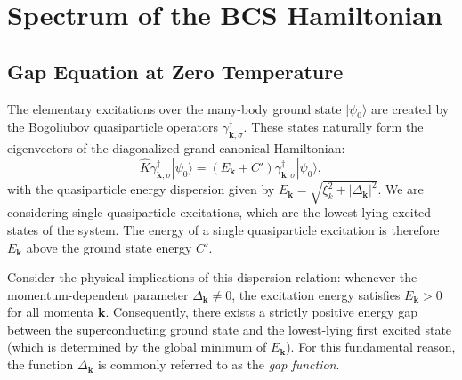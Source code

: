 \section{Spectrum of the BCS Hamiltonian}

\subsection{Gap Equation at Zero Temperature}

The elementary excitations over the many-body ground state \( |\psi_0\rangle \) are created by the Bogoliubov quasiparticle operators \( \gamma_{\mathbf{k},\sigma}^\dagger \). These states naturally form the eigenvectors of the diagonalized grand canonical Hamiltonian:
\[
    \hat{K}\gamma_{\mathbf{k},\sigma}^\dagger |\psi_0\rangle = (E_{\mathbf{k}} + C')\gamma_{\mathbf{k},\sigma}^\dagger |\psi_0\rangle,
\]
with the quasiparticle energy dispersion given by \( E_{\mathbf{k}} = \sqrt{\xi_k^2 + |\Delta_{\mathbf{k}}|^2} \). We are considering single quasiparticle excitations, which are the lowest-lying excited states of the system. The energy of a single quasiparticle excitation is therefore \( E_{\mathbf{k}} \) above the ground state energy \( C' \).

Consider the physical implications of this dispersion relation: whenever the momentum-dependent parameter \( \Delta_{\mathbf{k}} \neq 0 \), the excitation energy satisfies \( E_{\mathbf{k}} > 0 \) for all momenta \( \mathbf{k} \). Consequently, there exists a strictly positive energy gap between the superconducting ground state and the lowest-lying first excited state (which is determined by the global minimum of \( E_{\mathbf{k}} \)). For this fundamental reason, the function \( \Delta_{\mathbf{k}} \) is commonly referred to as the \emph{gap function}.

